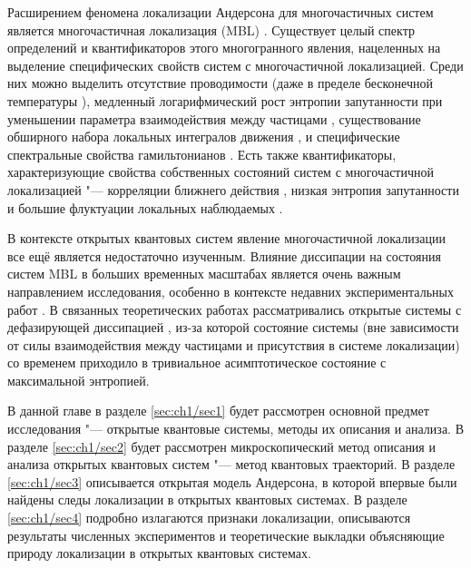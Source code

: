 Расширением феномена локализации Андерсона для многочастичных систем является многочастичная локализация (MBL) \cite{Basko2006, Gornyi2005}.
Существует целый спектр определений и квантификаторов этого многогранного явления, нацеленных на выделение специфических свойств систем с многочастичной локализацией.
Среди них можно выделить отсутствие проводимости \autocite{Gornyi2005} (даже в пределе бесконечной температуры \autocite{Basko2006}), медленный логарифмический рост энтропии запутанности при уменьшении параметра взаимодействия между частицами \autocite{Chiara2006, Znidaric2008, Bardarson2012, Serbyn2013_1}, существование обширного набора локальных интегралов движения \autocite{Serbyn2013_2}, и специфические спектральные свойства гамильтонианов \autocite{Oganesyan2007, Serbyn2016}.
Есть также квантификаторы, характеризующие свойства собственных состояний систем с многочастичной локализацией "--- корреляции ближнего действия \autocite{Pal2010}, низкая энтропия запутанности \autocite{Bauer2013, Kjll2014, Khemani2017} и большие флуктуации локальных наблюдаемых \autocite{Bera2015}.

В контексте открытых квантовых систем явление многочастичной локализации все ещё является недостаточно изученным. Влияние диссипации на состояния систем  MBL в больших временных масштабах является очень важным направлением исследования, особенно в контексте недавних экспериментальных работ \autocite{Schreiber2015, Choi2016, Bordia2017, Smith2016}. В связанных теоретических работах \autocite{Levi2016, Fischer2016, Medvedyeva2016} рассматривались открытые системы с дефазирующей диссипацией \autocite{Poletti2013}, из-за которой состояние системы (вне зависимости от силы взаимодействия между частицами и присутствия в системе локализации) со временем приходило в тривиальное асимптотическое состояние с максимальной энтропией.

В данной главе в разделе \cref{sec:ch1/sec1} будет рассмотрен основной предмет исследования "--- открытые квантовые системы, методы их описания и анализа. 
В разделе \cref{sec:ch1/sec2} будет рассмотрен микроскопический метод описания и анализа открытых квантовых систем "--- метод квантовых траекторий.
В разделе \cref{sec:ch1/sec3} описывается открытая модель Андерсона, в которой впервые были найдены следы локализации в открытых квантовых системах.
В разделе \cref{sec:ch1/sec4} подробно излагаются признаки локализации, описываются результаты численных экспериментов и теоретические выкладки объясняющие природу локализации в открытых квантовых системах. 

